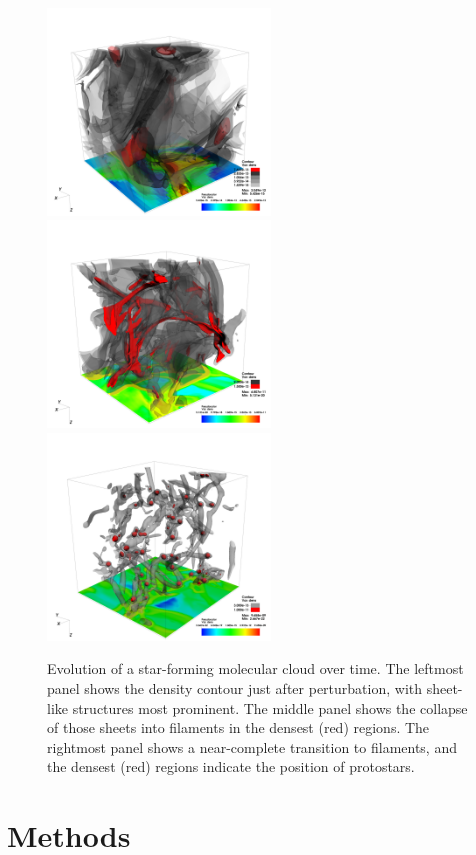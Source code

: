 \documentclass[iop]{emulateapj}
\begin{document}
\begin{figure}[h]
\begin{center}
\includegraphics[height=5.5cm,clip=true]{Graphics/bbb_0375_dens_contour_00500000.png}%
\includegraphics[height=5.5cm,clip=true]{Graphics/bbb_0375_dens_contour_0200_0002.png}%
\includegraphics[height=5.5cm,clip=true]{Graphics/bbb_0375_dens_contour0000.png}
\end{center}
\caption{Evolution of a star-forming molecular cloud over time. The leftmost panel shows the density contour just after perturbation, with sheet-like structures most prominent. The middle panel shows the collapse of those sheets into filaments in the densest (red) regions. The rightmost panel shows a near-complete transition to filaments, and the densest (red) regions indicate the position of protostars.}
\label{f:cloudevolution}
\end{figure}

\section{Methods}\label{Methods}
\end{document}
